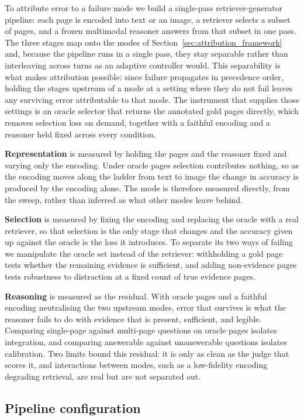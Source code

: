 \documentclass[11pt]{article}
\begin{document}
To attribute error to a failure mode we build a single-pass retriever-generator pipeline: each page is encoded into text or an image, a retriever selects a subset of pages, and a frozen multimodal reasoner answers from that subset in one pass. The three stages map onto the modes of Section~\ref{sec:attribution_framework} and, because the pipeline runs in a single pass, they stay separable rather than interleaving across turns as an adaptive controller would. This separability is what makes attribution possible: since failure propagates in precedence order, holding the stages upstream of a mode at a setting where they do not fail leaves any surviving error attributable to that mode. The instrument that supplies those settings is an oracle selector that returns the annotated gold pages directly, which removes selection loss on demand, together with a faithful encoding and a reasoner held fixed across every condition.

\textbf{Representation} is measured by holding the pages and the reasoner fixed and varying only the encoding. Under oracle pages selection contributes nothing, so as the encoding moves along the ladder from text to image the change in accuracy is produced by the encoding alone. The mode is therefore measured directly, from the sweep, rather than inferred as what other modes leave behind.

\textbf{Selection} is measured by fixing the encoding and replacing the oracle with a real retriever, so that selection is the only stage that changes and the accuracy given up against the oracle is the loss it introduces. To separate its two ways of failing we manipulate the oracle set instead of the retriever: withholding a gold page tests whether the remaining evidence is sufficient, and adding non-evidence pages tests robustness to distraction at a fixed count of true evidence pages.

\textbf{Reasoning} is measured as the residual. With oracle pages and a faithful encoding neutralising the two upstream modes, error that survives is what the reasoner fails to do with evidence that is present, sufficient, and legible. Comparing single-page against multi-page questions on oracle pages isolates integration, and comparing answerable against unanswerable questions isolates calibration. Two limits bound this residual: it is only as clean as the judge that scores it, and interactions between modes, such as a low-fidelity encoding degrading retrieval, are real but are not separated out.

\subsection{Pipeline configuration}
\label{subsec:config}
\end{document}
